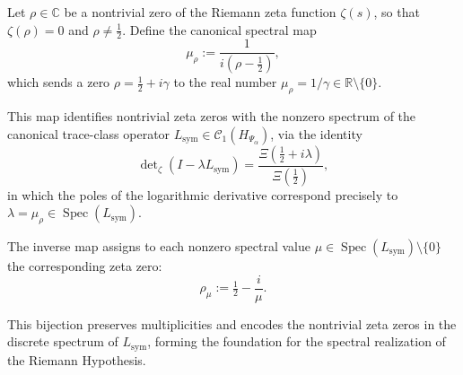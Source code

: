 \begin{definition}
\label{def:spectral_zero_map}
Let \( \rho \in \mathbb{C} \) be a nontrivial zero of the Riemann zeta function \( \zeta(s) \), so that \( \zeta(\rho) = 0 \) and \( \rho \ne \tfrac{1}{2} \). Define the canonical spectral map
\[
\mu_\rho := \frac{1}{i(\rho - \tfrac{1}{2})},
\]
which sends a zero \( \rho = \tfrac{1}{2} + i\gamma \) to the real number \( \mu_\rho = 1/\gamma \in \mathbb{R} \setminus \{0\} \).

\medskip
\noindent
This map identifies nontrivial zeta zeros with the nonzero spectrum of the canonical trace-class operator \( L_{\mathrm{sym}} \in \mathcal{C}_1(H_{\Psi_\alpha}) \), via the identity
\[
\det\nolimits_\zeta(I - \lambda L_{\mathrm{sym}}) = \frac{\Xi\left(\tfrac{1}{2} + i\lambda\right)}{\Xi\left(\tfrac{1}{2}\right)},
\]
in which the poles of the logarithmic derivative correspond precisely to \( \lambda = \mu_\rho \in \operatorname{Spec}(L_{\mathrm{sym}}) \).

\medskip
\noindent
The inverse map assigns to each nonzero spectral value \( \mu \in \operatorname{Spec}(L_{\mathrm{sym}}) \setminus \{0\} \) the corresponding zeta zero:
\[
\rho_\mu := \tfrac{1}{2} - \frac{i}{\mu}.
\]

\medskip
\noindent
This bijection preserves multiplicities and encodes the nontrivial zeta zeros in the discrete spectrum of \( L_{\mathrm{sym}} \), forming the foundation for the spectral realization of the Riemann Hypothesis.
\end{definition}
% 